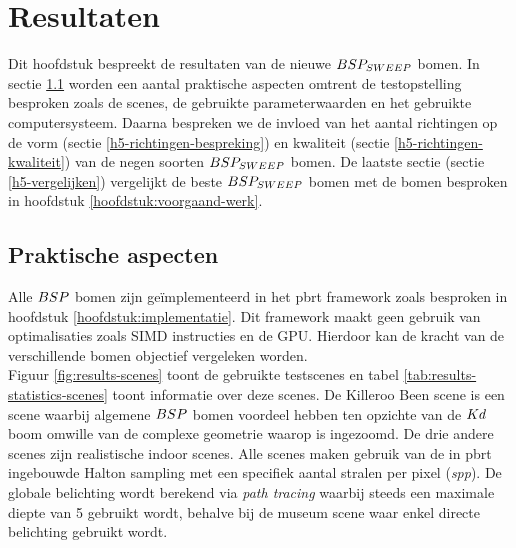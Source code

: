 \newcommand\skipCaption[1]{
  \vspace*{-6mm}
  \caption{#1}
}

\newcommand\skipCaptionA[2]{
  \vspace*{-#1mm}
  \caption{#2}
}

\chapter{Resultaten}
\label{hoofdstuk:resultaten}
Dit hoofdstuk bespreekt de resultaten van de nieuwe $BSP_{SWEEP}$ bomen.
In sectie \ref{h5:praktische-aspecten} worden een aantal praktische aspecten omtrent de testopstelling besproken zoals de scenes, de gebruikte parameterwaarden en het gebruikte computersysteem.
Daarna bespreken we de invloed van het aantal richtingen op de vorm (sectie \ref{h5-richtingen-bespreking}) en kwaliteit (sectie \ref{h5-richtingen-kwaliteit}) van de negen soorten $BSP_{SWEEP}$ bomen.
De laatste sectie (sectie \ref{h5-vergelijken}) vergelijkt de beste $BSP_{SWEEP}$ bomen met de bomen besproken in hoofdstuk \ref{hoofdstuk:voorgaand-werk}.

\section{Praktische aspecten}
\label{h5:praktische-aspecten}
Alle $BSP$ bomen zijn geïmplementeerd in het pbrt \cite{pbrt} framework zoals besproken in hoofdstuk \ref{hoofdstuk:implementatie}. 
Dit framework maakt geen gebruik van optimalisaties zoals SIMD instructies en de GPU. 
Hierdoor kan de kracht van de verschillende bomen objectief vergeleken worden.\\

Figuur \ref{fig:results-scenes} toont de gebruikte testscenes en tabel \ref{tab:results-statistics-scenes} toont informatie over deze scenes.
De Killeroo Been scene is een scene waarbij algemene $BSP$ bomen voordeel hebben ten opzichte van de $Kd$ boom omwille van de complexe geometrie waarop is ingezoomd.
De drie andere scenes zijn realistische indoor scenes.
Alle scenes maken gebruik van de in pbrt ingebouwde Halton sampling \cite{pbrt} met een specifiek aantal stralen per pixel (\textit{spp}).
De globale belichting wordt berekend via \textit{path tracing} waarbij steeds een maximale diepte van 5 gebruikt wordt, behalve bij de museum scene waar enkel directe belichting gebruikt wordt.\\


